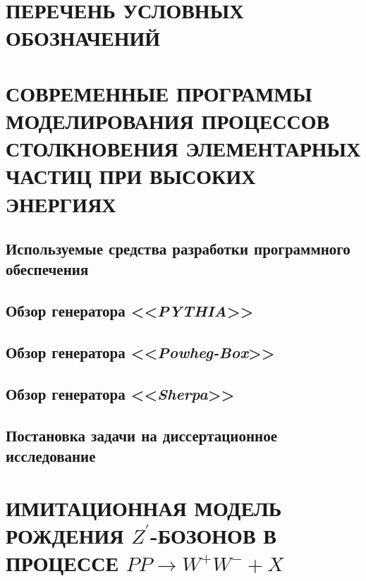 \documentclass[12pt,a4paper]{styles/report}
\begin{document}
	
\renewcommand\contentsname{ОГЛАВЛЕНИЕ}
\renewcommand{\bibname}{БИБЛИОГРАФИЧЕСКИЙ СПИСОК}
\renewcommand\chaptername{ГЛАВА}
\renewcommand\figurename{Рисунок}
\renewcommand\tablename{Таблица}



\newpage
\pagestyle{plain}  \setcounter{page}{2}
\large \tableofcontents

\newpage
\chapter*{ПЕРЕЧЕНЬ УСЛОВНЫХ ОБОЗНАЧЕНИЙ}






\chapter{СОВРЕМЕННЫЕ ПРОГРАММЫ МОДЕЛИРОВАНИЯ ПРОЦЕССОВ СТОЛКНОВЕНИЯ ЭЛЕМЕНТАРНЫХ ЧАСТИЦ ПРИ ВЫСОКИХ ЭНЕРГИЯХ}

\section{Используемые средства разработки программного обеспечения}


\section{Обзор генератора <<\textit{PYTHIA}>>}

\section{Обзор генератора <<\textit{Powheg-Box}>>}

\section{Обзор генератора <<\textit{Sherpa}>>}

\section{Постановка задачи на диссертационное исследование}


\chapter{ИМИТАЦИОННАЯ МОДЕЛЬ РОЖДЕНИЯ $Z^\prime$-БОЗОНОВ В ПРОЦЕССЕ $PP \rightarrow W^+W^- + X$}
\end{document}
